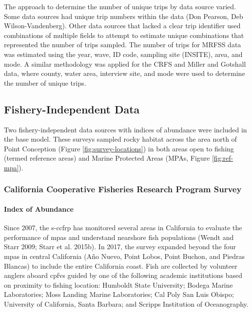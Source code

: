 \documentclass[11pt,
  english,
  letterpaper,
]{article}
\begin{document}
The approach to determine the number of unique trips by data source varied. Some data sources had unique trip numbers within the data (Don Pearson, Deb Wilson-Vandenberg). Other data sources that lacked a clear trip identifier used combinations of multiple fields to attempt to estimate unique combinations that represented the number of trips sampled. The number of trips for MRFSS data was estimated using the year, wave, ID code, sampling site (INSITE), area, and mode. A similar methodology was applied for the CRFS and Miller and Gotshall data, where county, water area, interview site, and mode were used to determine the number of unique trips.

\hypertarget{fishery-independent-data}{%
\subsection{Fishery-Independent Data}\label{fishery-independent-data}}

Two fishery-independent data sources with indices of abundance were included in the base model. These surveys sampled rocky habitat across the area north of Point Conception (Figure \ref{fig:survey-locations}) in both areas open to fishing (termed reference areas) and Marine Protected Areas (MPAs, Figure \ref{fig:ref-mpa}).

\hypertarget{california-cooperative-fisheries-research-program-survey}{%
\subsubsection{California Cooperative Fisheries Research Program Survey}\label{california-cooperative-fisheries-research-program-survey}}

\hypertarget{index-of-abundance}{%
\paragraph{Index of Abundance}\label{index-of-abundance}}

\hfill\break

Since 2007, the \gls{s-ccfrp} has monitored several areas in California to evaluate the performance of \glspl{mpa} and understand nearshore fish populations (Wendt and Starr 2009; Starr et al. 2015b). In 2017, the survey expanded beyond the four \Gls{mpa}s in central California (Año Nuevo, Point Lobos, Point Buchon, and Piedras Blancas) to include the entire California coast. Fish are collected by volunteer anglers aboard \glspl{cpfv} guided by one of the following academic institutions based on proximity to fishing location: Humboldt State University; Bodega Marine Laboratories; Moss Landing Marine Laboratories; Cal Poly San Luis Obispo; University of California, Santa Barbara; and Scripps Institution of Oceanography.
\end{document}
